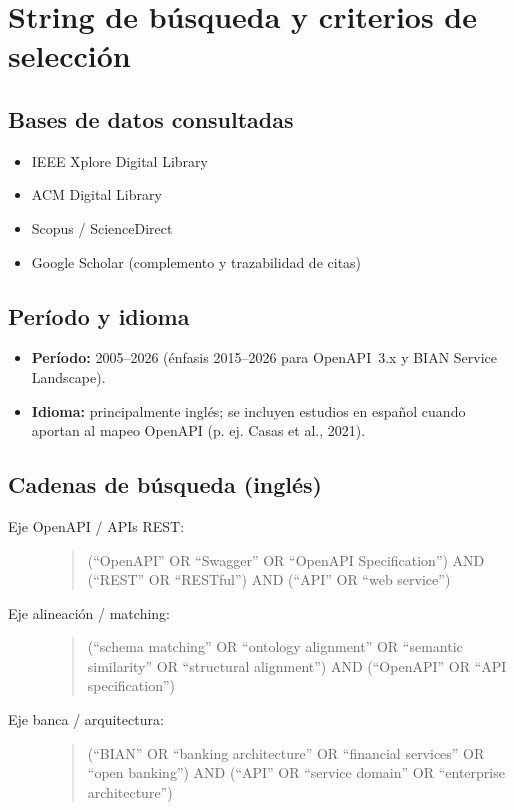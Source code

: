 \chapter{String de búsqueda y criterios de selección}
\label{anexo:a}

\section{Bases de datos consultadas}

\begin{itemize}
  \item IEEE Xplore Digital Library
  \item ACM Digital Library
  \item Scopus / ScienceDirect
  \item Google Scholar (complemento y trazabilidad de citas)
\end{itemize}

\section{Período y idioma}

\begin{itemize}
  \item \textbf{Período:} 2005--2026 (énfasis 2015--2026 para OpenAPI~3.x y BIAN Service Landscape).
  \item \textbf{Idioma:} principalmente inglés; se incluyen estudios en español cuando aportan al
        mapeo OpenAPI (p. ej. Casas et al., 2021).
\end{itemize}

\section{Cadenas de búsqueda (inglés)}

\begin{description}
  \item[Eje OpenAPI / APIs REST:]
    \begin{quote}\small\ttfamily
      (``OpenAPI'' OR ``Swagger'' OR ``OpenAPI Specification'') AND (``REST'' OR ``RESTful'')
      AND (``API'' OR ``web service'')
    \end{quote}
  \item[Eje alineación / matching:]
    \begin{quote}\small\ttfamily
      (``schema matching'' OR ``ontology alignment'' OR ``semantic similarity'' OR
      ``structural alignment'') AND (``OpenAPI'' OR ``API specification'')
    \end{quote}
  \item[Eje banca / arquitectura:]
    \begin{quote}\small\ttfamily
      (``BIAN'' OR ``banking architecture'' OR ``financial services'' OR ``open banking'') AND
      (``API'' OR ``service domain'' OR ``enterprise architecture'')
    \end{quote}
\end{description}

